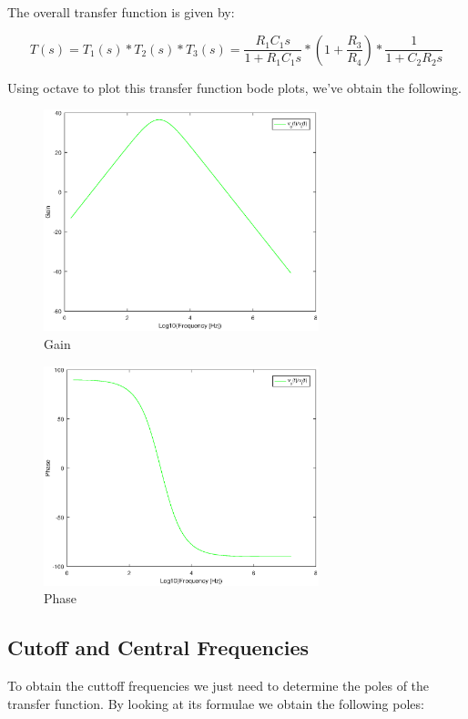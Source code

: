 The overall transfer function is given by:

\begin{equation}
T(s) = T_1(s)*T_2(s)*T_3(s) = \frac{R_1C_1s}{1+R_1C_1s}*(1 + \frac{R_3}{R_4})*\frac{1}{1+ C_2R_2s}
\end{equation} 

Using octave to plot this transfer function bode plots, we've obtain the following.

\begin{figure}[H] 
\centering
\includegraphics[width = 8cm]{gain.eps} 
\caption{Gain}
\label{gain}
\end{figure}

\begin{figure}[H] 
\centering
\includegraphics[width = 8cm]{phase.eps} 
\caption{Phase}
\label{phase}
\end{figure}

\subsection{Cutoff and Central Frequencies}

To obtain the cuttoff frequencies we just need to determine the poles of the transfer function. By looking at its formulae we obtain the following poles:

